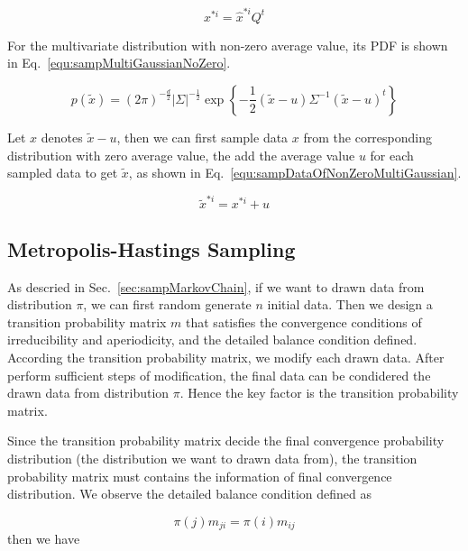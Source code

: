\documentclass[runningheads,openany]{xhlPaper}
\begin{document}
\begin{equation}
\label{equ:sampDataOfZeroMultiGaussian}
x^{*i} = \hat{x}^{*i}Q^{t}
\end{equation}

For the multivariate distribution with non-zero average value, its PDF is shown in Eq.~\ref{equ:sampMultiGaussianNoZero}.

\begin{equation}
\label{equ:sampMultiGaussianNoZero}
p\left(\tilde{x} \right) = {\left( {2\pi } \right)^{ - \frac{d}{2}}}| \Sigma |^{-\frac{1}{2}}\exp \left\{ { - \frac{1}{2}\left( {\tilde x - u} \right){\Sigma ^{ - 1}}{{\left( {\tilde x - u} \right)}^t}} \right\}
\end{equation}

Let $x$ denotes $\tilde x - u$, then we can first sample data $x$ from the corresponding distribution with zero average value, the add the average value $u$ for each sampled data to get $\tilde x$, as shown in Eq.~\ref{equ:sampDataOfNonZeroMultiGaussian}.

\begin{equation}
\label{equ:sampDataOfNonZeroMultiGaussian}
\tilde x^{*i} = x^{*i} + u
\end{equation}

\subsection{Metropolis-Hastings Sampling}
\label{sec:metropolis_hastings_sampling}
As descried in Sec.~\ref{sec:sampMarkovChain}, if we want to drawn data from distribution $\pi$, we can first random generate $n$ initial data.
Then we design a transition probability matrix $m$ that satisfies the convergence conditions of irreducibility and aperiodicity, and the detailed balance condition defined.
According the transition probability matrix, we modify each drawn data.
After perform sufficient steps of modification, the final data can be condidered the drawn data from distribution $\pi$.
Hence the key factor is the transition probability matrix.

Since the transition probability matrix decide the final convergence probability distribution (the distribution we want to drawn data from), the transition probability matrix must contains the information of final convergence distribution.
We observe the detailed balance condition defined as

\begin{displaymath}
\label{equ:metropolis_hastings_sampling_detailed_balance}
\pi \left( j \right){m_{ji}} = \pi \left( i \right){m_{ij}}
\end{displaymath}
then we have 
\end{document}
